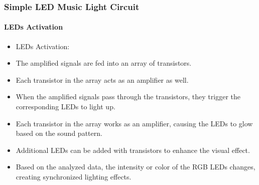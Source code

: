 \documentclass{beamer}
\begin{document}
\begin{frame}
\frametitle{Simple LED Music Light Circuit}
\framesubtitle{LEDs Activation}
\begin{itemize}
  \item LEDs Activation:
  \item The amplified signals are fed into an array of transistors.
  \item Each transistor in the array acts as an amplifier as well.
  \item When the amplified signals pass through the transistors, they trigger the corresponding LEDs to light up.
  \item Each transistor in the array works as an amplifier, causing the LEDs to glow based on the sound pattern.
  \item Additional LEDs can be added with transistors to enhance the visual effect.
  \item Based on the analyzed data, the intensity or color of the RGB LEDs changes, creating synchronized lighting effects.
\end{itemize}
\end{frame}
\end{document}
